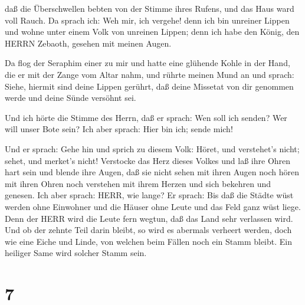  daß die Überschwellen bebten von der Stimme ihres Rufens,
und das Haus ward voll Rauch.  Da sprach ich: Weh mir, ich
vergehe! denn ich bin unreiner Lippen und wohne unter einem Volk von
unreinen Lippen; denn ich habe den König, den HERRN Zebaoth, gesehen mit
meinen Augen.

 Da flog der Seraphim einer zu mir und hatte eine glühende
Kohle in der Hand, die er mit der Zange vom Altar nahm,  und
rührte meinen Mund an und sprach: Siehe, hiermit sind deine Lippen
gerührt, daß deine Missetat von dir genommen werde und deine Sünde
versöhnt sei.

 Und ich hörte die Stimme des Herrn, daß er sprach: Wen soll
ich senden? Wer will unser Bote sein? Ich aber sprach: Hier bin ich;
sende mich!

 Und er sprach: Gehe hin und sprich zu diesem Volk: Höret,
und verstehet's nicht; sehet, und merket's nicht! 
Verstocke das Herz dieses Volkes und laß ihre Ohren hart sein und blende
ihre Augen, daß sie nicht sehen mit ihren Augen noch hören mit ihren
Ohren noch verstehen mit ihrem Herzen und sich bekehren und genesen.
 Ich aber sprach: HERR, wie lange? Er sprach: Bis daß die
Städte wüst werden ohne Einwohner und die Häuser ohne Leute und das Feld
ganz wüst liege.  Denn der HERR wird die Leute fern wegtun,
daß das Land sehr verlassen wird.  Und ob der zehnte Teil
darin bleibt, so wird es abermals verheert werden, doch wie eine Eiche
und Linde, von welchen beim Fällen noch ein Stamm bleibt. Ein heiliger
Same wird solcher Stamm sein.

\hypertarget{section-6}{%
\section{7}\label{section-6}}

